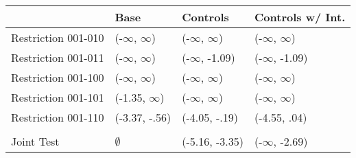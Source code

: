 \begin{tabular}{llll}
\toprule
{} &           Base &        Controls & Controls w/ Int. \\
\midrule
Restriction 001-010 &      (-$\infty$, $\infty$) &       (-$\infty$, $\infty$) &        (-$\infty$, $\infty$) \\
Restriction 001-011 &      (-$\infty$, $\infty$) &    (-$\infty$, -1.09) &     (-$\infty$, -1.09) \\
Restriction 001-100 &      (-$\infty$, $\infty$) &       (-$\infty$, $\infty$) &        (-$\infty$, $\infty$) \\
Restriction 001-101 &    (-1.35, $\infty$) &       (-$\infty$, $\infty$) &        (-$\infty$, $\infty$) \\
Restriction 001-110 &  (-3.37, -.56) &   (-4.05, -.19) &     (-4.55, .04) \\
\hline\\Joint Test  &         $\emptyset$ &  (-5.16, -3.35) &     (-$\infty$, -2.69) \\
\bottomrule
\end{tabular}
